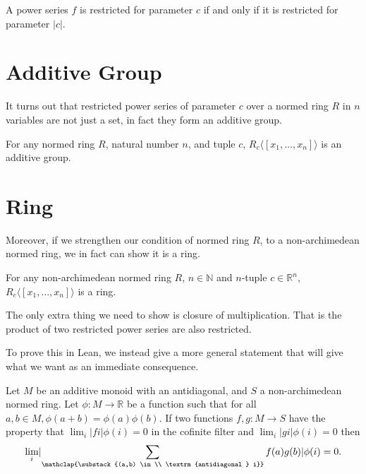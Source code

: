 \begin{lemma}
  A power series $f$ is restricted for parameter $c$ if and only if it is restricted for parameter
  $\lvert c \rvert$.
\end{lemma}

\section{Additive Group}

It turns out that restricted power series of parameter $c$ over a normed ring $R$ in $n$ variables
are not just a set, in fact they form an additive group.

\begin{lemma}
  For any normed ring $R$, natural number $n$, and tuple $c$,
  $R_c \langle \! [ x_1, \dots, x_n ] \! \rangle$ is an additive group.
\end{lemma}

\section{Ring}

Moreover, if we strengthen our condition of normed ring $R$, to a non-archimedean normed ring, we
in fact can show it is a ring.

\begin{theorem}
  For any non-archimedean normed ring $R$, $n \in \mathbb{N}$ and $n$-tuple $c \in \mathbb{R}^n$,
  $R_c \langle \! [ x_1, \dots, x_n ] \! \rangle$ is a ring.
\end{theorem}

The only extra thing we need to show is closure of multiplication. That is the product of two restricted
power series are also restricted.

To prove this in Lean, we instead give a more general statement that will give what we want as an
immediate consequence.

\begin{lemma}
  Let $M$ be an additive monoid with an antidiagonal, and $S$ a non-archimedean normed ring. Let
  $\phi : M \to \mathbb{R}$ be a function such that for all $a, b \in M, \phi(a + b) = \phi(a)
  \phi(b)$. If two functions $f, g : M \to S$ have the property that
  $\lim_i \lvert f i \rvert \phi (i) = 0$ in the cofinite filter and
  $\lim_i \lvert g i \rvert \phi (i) = 0$ then
  \[
  \lim_i \lvert \sum_{\mathclap{\substack{(a,b) \in \\ \textrm{antidiagonal } i}}} f(a) g(b) \rvert
  \phi(i) = 0.
  \]
\end{lemma}

